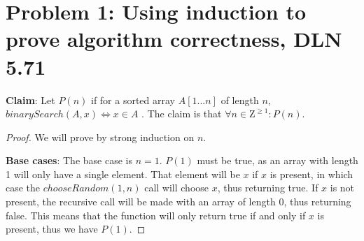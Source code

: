 \documentclass[titlepage]{article}
\begin{document}
 \maketitle

\section{Problem 1: Using induction to prove algorithm correctness, DLN 5.71}

\textbf{Claim}: Let $P(n)$ if for a sorted array $A[1...n]$ of length $n$, $binarySearch(A, x) \iff x \in A$ .  The claim is that $\forall n \in \mathrm{Z}^{\geq 1}: P(n)$.

\begin{proof}
We will prove by strong induction on $n$.

\textbf{Base cases}: The base case is $n=1$. $P(1)$ must be true, as an array with length 1 will only have a single element. That element will be $x$ if $x$ is present, in which case the $chooseRandom(1,n)$ call will choose $x$, thus returning true. If $x$ is not present, the recursive call will be made with an array of length 0, thus returning false. This means that the function will only return true if and only if $x$ is present, thus we have $P(1)$.


\end{proof}
\end{document}
